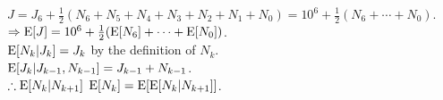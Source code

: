 \begin{pr}
$J=J_6+\frac12(N_6+N_5+N_4+N_3+N_2+N_1+N_0)=10^6+\frac12(N_6+\cdots+N_0)$.\\
$\Rightarrow\mathrm{E}[J]=10^6+\frac12(\mathrm{E}[N_6]+\cdots+\mathrm{E}[N_0])$.\\
$\mathrm{E}[N_k|J_k]=J_k$ by the definition of $N_k$.\\
$\mathrm{E}[J_k|J_{k-1}, N_{k-1}]=J_{k-1}+N_{k-1}$.\\
$\therefore\mathrm{E}[N_k|N_{k+1}]$
$\mathrm{E}[N_k]=\mathrm{E}[\mathrm{E}[N_k|N_{k+1}]]$.
\end{pr}
